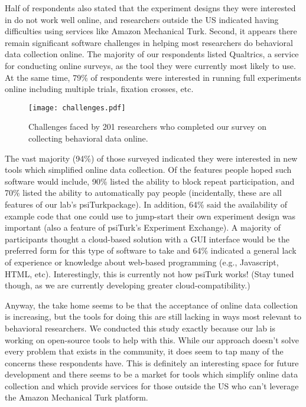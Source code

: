 \documentclass[jou,apacite]{apa6}
\begin{document}
Half of respondents also stated that the experiment designs they were interested in do not work well online, and researchers outside the US indicated having difficulties using services like Amazon Mechanical Turk.
Second, it appears there remain significant software challenges in helping most researchers do behavioral data collection online.
The majority of our respondents listed Qualtrics, a service for conducting online surveys, as the tool they were currently most likely to use.
At the same time, 79\% of respondents were interested in running full experiments online including multiple trials, fixation crosses, etc.

\begin{figure*}[tp]
\centering
\texttt{[image: challenges.pdf]}
\label{fig:challenges}
\caption{Challenges faced by 201 researchers who completed our survey on collecting behavioral data online.}
\end{figure*}

The vast majority (94\%) of those surveyed indicated they were interested in new tools which simplified online data collection.
Of the features people hoped such software would include, 90\% listed the ability to block repeat participation, and 70\% listed the ability to automatically pay people (incidentally, these are all features of our lab's psiTurkpackage).
In addition, 64\% said the availability of example code that one could use to jump-start their own experiment design was important (also a feature of psiTurk's Experiment Exchange).
A majority of participants thought a cloud-based solution with a GUI interface would be the preferred form for this type of software to take and 64\% indicated a general lack of experience or knowledge about web-based programming (e.g., Javascript, HTML, etc).
Interestingly, this is currently not how psiTurk works! (Stay tuned though, as we are currently developing greater cloud-compatibility.)

Anyway, the take home seems to be that the acceptance of online data collection is increasing, but the tools for doing this are still lacking in ways most relevant to behavioral researchers.
We conducted this study exactly because our lab is working on open-source tools to help with this.
While our approach doesn't solve every problem that exists in the community, it does seem to tap many of the concerns these respondents have.
This is definitely an interesting space for future development and there seems to be a market for tools which simplify online data collection and which provide services for those outside the US who can't leverage the Amazon Mechanical Turk platform.
\end{document}

